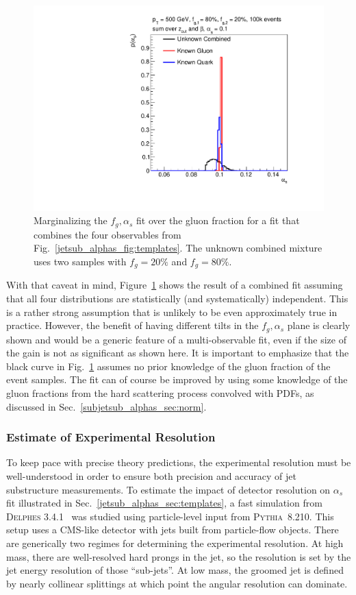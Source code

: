 \documentclass[11pt]{cernrep}
\begin{document}
\begin{figure}[t]
\begin{center}
\includegraphics[width = 0.5\columnwidth]{jetsub_alphas_combination23451324.pdf}
\end{center}
\caption{Marginalizing the $f_g,\alpha_s$ fit over the gluon fraction for a fit that combines the four observables from Fig.~\ref{jetsub_alphas_fig:templates}.  The unknown combined mixture uses two samples with $f_g=20\%$ and $f_g=80\%$.}
\label{jetsub_alphas_fig:combo}
\end{figure}

With that caveat in mind, Figure~\ref{jetsub_alphas_fig:combo} shows the result of a combined fit assuming that all four distributions are statistically (and systematically) independent.
%
This is a rather strong assumption that is unlikely to be even approximately true in practice.
%
However, the benefit of having different tilts in the $f_g,\alpha_s$ plane is clearly shown and would be a generic feature of a multi-observable fit, even if the size of the gain is not as significant as shown here.
%
It is important to emphasize that the black curve in Fig.~\ref{jetsub_alphas_fig:combo} assumes no prior knowledge of the gluon fraction of the event samples.
%
The fit can of course be improved by using some knowledge of the gluon fractions from the hard scattering process convolved with PDFs, as discussed in Sec.~\ref{subjetsub_alphas_sec:norm}.

\subsubsection{Estimate of Experimental Resolution}
\label{jetsub_alphas_sec:resolution}

To keep pace with precise theory predictions, the experimental resolution must be well-understood in order to ensure both precision and accuracy of jet substructure measurements.
%
To estimate the impact of detector resolution on $\alpha_s$ fit illustrated in Sec.~\ref{jetsub_alphas_sec:templates}, a fast simulation from \textsc{Delphes} 3.4.1~\cite{deFavereau:2013fsa} was studied using particle-level input from \textsc{Pythia~8}.210.
%
This setup uses a CMS-like detector with jets built from particle-flow objects.
%
There are generically two regimes for determining the experimental resolution.
%
At high mass, there are well-resolved hard prongs in the jet, so the resolution is set by the jet energy resolution of those ``sub-jets''.
%
At low mass, the groomed jet is defined by nearly collinear splittings at which point the angular resolution can dominate.
\end{document}
